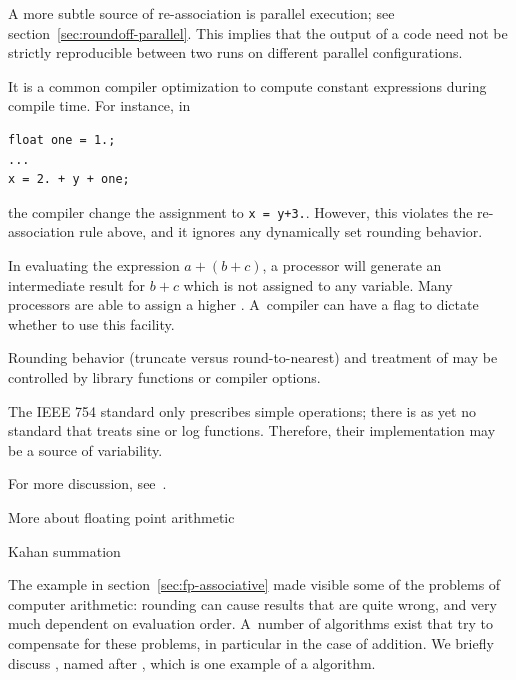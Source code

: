 A more subtle source of re-association is parallel execution; 
see section~\ref{sec:roundoff-parallel}. This implies that the output
of a code need not be strictly reproducible between two runs on
different parallel configurations.


%
It is a common compiler optimization to compute constant expressions
during compile time. For instance, in
\begin{lstlisting}
float one = 1.;
...
x = 2. + y + one;
\end{lstlisting}
the compiler change the assignment to \lstinline{x = y+3.}. However, this
violates the re-association rule above, and it ignores any dynamically
set rounding behavior.

In evaluating the expression $a+(b+c)$, a processor will generate an 
intermediate result for $b+c$ which is not assigned to any variable.
Many processors are able to assign a higher 
.
A~compiler can have a flag to dictate whether to use this facility.

%
Rounding behavior (truncate versus round-to-nearest) and treatment of
 may be controlled by library
functions or compiler options.

The IEEE 754 standard only prescribes simple operations;
there is as yet no standard that treats sine or log functions.
Therefore, their implementation may be a source of variability.

For more discussion, see~\cite{Lionel:reproducibility}.


 {More about floating point arithmetic}

 {Kahan summation}
\label{sec:arith-kahan}

The example in section~\ref{sec:fp-associative} made visible some of
the problems of computer arithmetic: rounding can cause results that
are quite wrong, and very much dependent on evaluation order. A~number
of algorithms exist that try to compensate for these problems, in
particular in the case of addition. We briefly discuss
\cite{Kahan:1965:summation}, named after
, which is one example of a
 algorithm.

